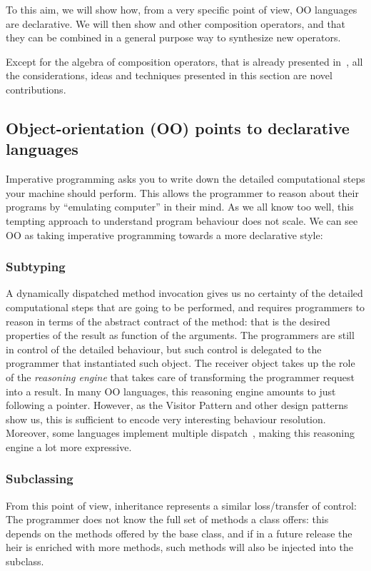 To this aim, we will show how, from a very specific point of view, OO languages are declarative.
We will then show \Q@Override@ and other composition operators, and that they can be 
combined in a general purpose way to synthesize new operators.

Except for the algebra of composition operators, that is already presented in~\cite{servetto2014meta},
all the considerations, ideas and techniques presented in this section are novel contributions.


\subsection*{Object-orientation (OO) points to declarative languages}
Imperative programming asks you to write down the
detailed computational steps your machine should perform.
This allows the programmer to reason about their
programs by ``emulating computer'' in their mind.
As we all know too well, this tempting approach to understand 
 program behaviour does not scale.
We can see OO
as taking imperative programming towards a more
declarative style:
\subsubsection*{Subtyping}
 A dynamically dispatched method invocation
gives us no certainty of the detailed computational steps
that are going to be performed, and
requires programmers to reason in terms of the
abstract contract of the method: that is
the desired properties of the result as function of the arguments.
The programmers are still in control of the detailed behaviour,
but such control is delegated to the programmer that
instantiated such object.
The receiver object takes up the role of the \emph{reasoning engine} that takes
care of transforming the programmer request into a result.
In many OO languages, this reasoning engine amounts to just following a pointer. However,
 as the Visitor Pattern and other  design patterns show us, this is sufficient to encode very interesting behaviour resolution.
Moreover, some languages implement multiple dispatch~\cite{clifton2000multijava}, making this reasoning engine a lot more expressive.
\subsubsection*{Subclassing}
From this point of view, inheritance
represents a similar loss/transfer of control:
The programmer does not know
the full set of methods a class offers:
this depends on the methods offered by the base class,
and if in a future release the heir is enriched with
more methods, such methods will also be injected into
the subclass.

